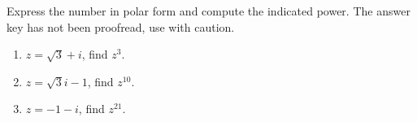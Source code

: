 Express the number in polar form and compute the indicated power. The answer key has not been proofread, use with caution.

\begin{enumerate}
\item $z=\sqrt{3}+i$, find $z^3$.


\item $z=\sqrt{3}i-1$, find $z^{10}$.


\item $z= -1-i$, find $z^{21}$.

\end{enumerate}  

